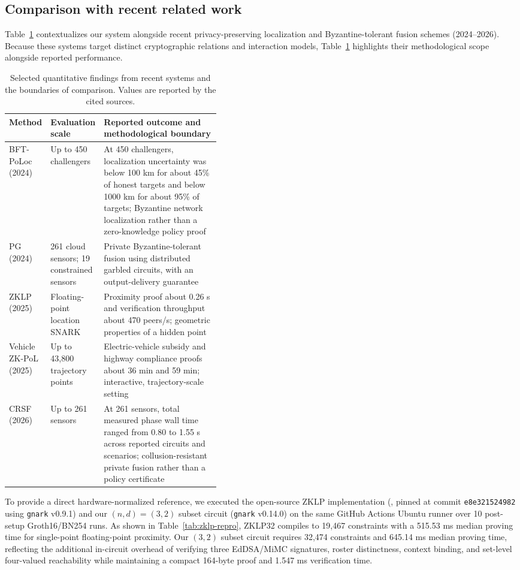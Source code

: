 \subsection{Comparison with recent related work}
Table~\ref{tab:recent-context} contextualizes our system alongside recent privacy-preserving localization and Byzantine-tolerant fusion schemes (2024--2026). Because these systems target distinct cryptographic relations and interaction models, Table~\ref{tab:recent-context} highlights their methodological scope alongside reported performance.



\begin{table}[htbp]\centering\footnotesize
\caption{Selected quantitative findings from recent systems and the boundaries of comparison. Values are reported by the cited sources.}\label{tab:recent-context}
\begin{tabularx}{\linewidth}{@{}p{0.17\linewidth}p{0.24\linewidth}X@{}}\toprule
Method&Evaluation scale&Reported outcome and methodological boundary\\\midrule
BFT-PoLoc (2024)~\citep{BFTPoLoc}&Up to 450 challengers&At 450 challengers, localization uncertainty was below 100 km for about 45\% of honest targets and below 1000 km for about 95\% of targets; Byzantine network localization rather than a zero-knowledge policy proof\\
PG (2024)~\citep{PG}&261 cloud sensors; 19 constrained sensors&Private Byzantine-tolerant fusion using distributed garbled circuits, with an output-delivery guarantee\\
ZKLP (2025)~\citep{ZKLP}&Floating-point location SNARK&Proximity proof about 0.26 s and verification throughput about 470 peers/s; geometric properties of a hidden point\\
Vehicle ZK-PoL (2025)~\citep{VehiclePolicy}&Up to 43,800 trajectory points&Electric-vehicle subsidy and highway compliance proofs about 36 min and 59 min; interactive, trajectory-scale setting\\
CRSF (2026)~\citep{CRSF}&Up to 261 sensors&At 261 sensors, total measured phase wall time ranged from 0.80 to 1.55 s across reported circuits and scenarios; collusion-resistant private fusion rather than a policy certificate\\\bottomrule
\end{tabularx}
\end{table}

To provide a direct hardware-normalized reference, we executed the open-source ZKLP implementation (\citet{ZKLP}, pinned at commit \texttt{e8e321524982} using \texttt{gnark} v0.9.1) and our $(n, d) = (3, 2)$ subset circuit (\texttt{gnark} v0.14.0) on the same GitHub Actions Ubuntu runner over 10 post-setup Groth16/BN254 runs. As shown in Table~\ref{tab:zklp-repro}, ZKLP32 compiles to 19,467 constraints with a 515.53 ms median proving time for single-point floating-point proximity. Our $(3, 2)$ subset circuit requires 32,474 constraints and 645.14 ms median proving time, reflecting the additional in-circuit overhead of verifying three EdDSA/MiMC signatures, roster distinctness, context binding, and set-level four-valued reachability while maintaining a compact 164-byte proof and 1.547 ms verification time.

